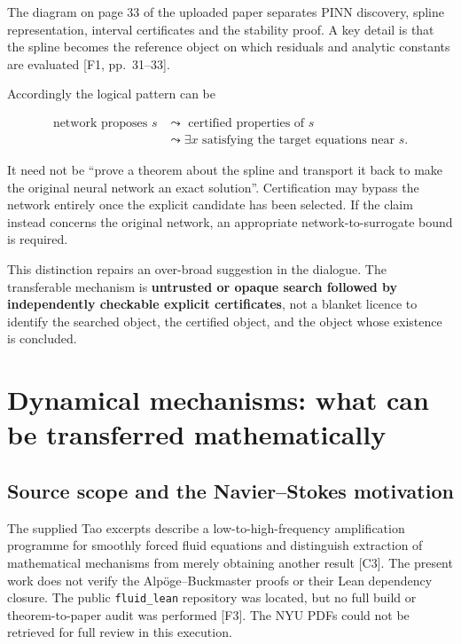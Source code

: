 \documentclass[11pt,a4paper]{article}
\begin{document}
The diagram on page 33 of the uploaded paper separates PINN discovery,
spline representation, interval certificates and the stability proof. A
key detail is that the spline becomes the reference object on which
residuals and analytic constants are evaluated {[}F1, pp.~31--33{]}.

Accordingly the logical pattern can be

\nopagebreak[4]

\[
\begin{aligned}
\text{network proposes }s
&\leadsto\text{ certified properties of }s\\
&\leadsto\exists x\text{ satisfying the target equations near }s.
\end{aligned}
\]

It need not be ``prove a theorem about the spline and transport it back
to make the original neural network an exact solution''. Certification
may bypass the network entirely once the explicit candidate has been
selected. If the claim instead concerns the original network, an
appropriate network-to-surrogate bound is required.

This distinction repairs an over-broad suggestion in the dialogue. The
transferable mechanism is \textbf{untrusted or opaque search followed by
independently checkable explicit certificates}, not a blanket licence to
identify the searched object, the certified object, and the object whose
existence is concluded.

\section{Dynamical mechanisms: what can be transferred
mathematically}\label{dynamical-mechanisms-what-can-be-transferred-mathematically}

\subsection{Source scope and the Navier--Stokes
motivation}\label{source-scope-and-the-navierstokes-motivation}

The supplied Tao excerpts describe a low-to-high-frequency amplification
programme for smoothly forced fluid equations and distinguish extraction
of mathematical mechanisms from merely obtaining another result
{[}C3{]}. The present work does not verify the Alpöge--Buckmaster proofs
or their Lean dependency closure. The public \texttt{fluid\_lean}
repository was located, but no full build or theorem-to-paper audit was
performed {[}F3{]}. The NYU PDFs could not be retrieved for full review
in this execution.
\end{document}
